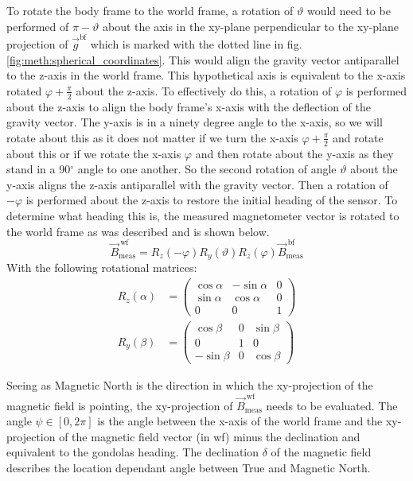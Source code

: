 To rotate the body frame to the world frame, a rotation of $\vartheta$ would need to be performed of $\pi-\vartheta$ about the axis in the xy-plane perpendicular to the xy-plane projection of $\vec{g}^{\mathrm{bf}}$ which is marked with the dotted line in fig. \ref{fig:meth:spherical_coordinates}. This would align the gravity vector antiparallel to the z-axis in the world frame. This hypothetical axis is equivalent to the x-axis rotated $\varphi+\frac{\pi}{2}$ about the z-axis. To effectively do this, a rotation of $\varphi$ is performed about the z-axis to align the body frame's x-axis with the deflection of the gravity vector. The y-axis is in  a ninety degree angle to the x-axis, so we will rotate about this as it does not matter if we turn the x-axis $\varphi+\frac{\pi}{2}$ and rotate about this or if we rotate the x-axis $\varphi$ and then rotate about the y-axis as they stand in a 90$^\circ$ angle to one another. So the second rotation of angle $\vartheta$ about the y-axis aligns the z-axis antiparallel with the gravity vector. Then a rotation of $-\varphi$ is performed about the z-axis to restore the initial heading of the sensor. To determine what heading this is, the measured magnetometer vector is rotated to the world frame as was described and is shown below.
\begin{equation}
    \vec{B}_{\mathrm{meas}}^{\ \mathrm{wf}}=R_z(-\varphi)R_y(\vartheta)R_z(\varphi)\vec{B}_{\mathrm{meas}}^{\ \mathrm{bf}}
\end{equation}
With the following rotational matrices:
\begin{align}
    R_z(\alpha)&=\begin{pmatrix}
                \cos\alpha & -\sin\alpha & 0 \\
                \sin\alpha & \cos\alpha & 0 \\
                0 & 0 & 1
                \end{pmatrix} \\
    R_y(\beta)&=\begin{pmatrix}
                \cos\beta & 0 & \sin\beta \\
                0 & 1 & 0 \\
                -\sin\beta & 0 & \cos\beta
                \end{pmatrix}
\end{align}

Seeing as Magnetic North is the direction in which the xy-projection of the magnetic field is pointing, the xy-projection of $\vec{B}_{\mathrm{meas}}^{\ \mathrm{wf}}$ needs to be evaluated. The angle $\psi\in[0,2\pi]$ is the angle between the x-axis of the world frame and the xy-projection of the magnetic field vector (in wf) minus the declination and equivalent to the gondolas heading. The declination $\delta$ of the magnetic field describes the location dependant angle between True and Magnetic North.

